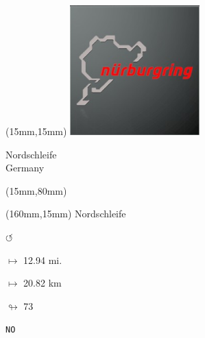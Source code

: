 \begin{textblock*}{50mm}(15mm,15mm)%
\includegraphics[width=50mm]{LG/2015-05-20_00088.png}
\par Nordschleife\\ Germany
\end{textblock*}
\begin{textblock*}{185mm}(15mm,80mm)%
\end{textblock*}
\begin{textblock*}{40mm}(160mm,15mm)%
Nordschleife
\par \Huge$\circlearrowleft$
\Large
\par$\mapsto$ 12.94 mi.
\par$\mapsto$ 20.82 km
\par$\looparrowright$ 73
\par\hfill\tiny\tt NO\\
\end{textblock*}
\null\newpage

